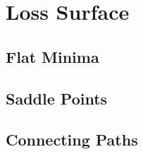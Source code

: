 
\chapter{Loss Surface}

\section{Flat Minima}

\textcite{hochreiterFlatMinima1997}

\section{Saddle Points}

\textcite{dauphinIdentifyingAttackingSaddle2014}
\textcite{choromanskaLossSurfacesMultilayer2015}
\textcite{pascanuSaddlePointProblem2014}

\section{Connecting Paths}

\textcite{garipovLossSurfacesMode2018} \textcite{izmailovAveragingWeightsLeads2019}



\endinput
